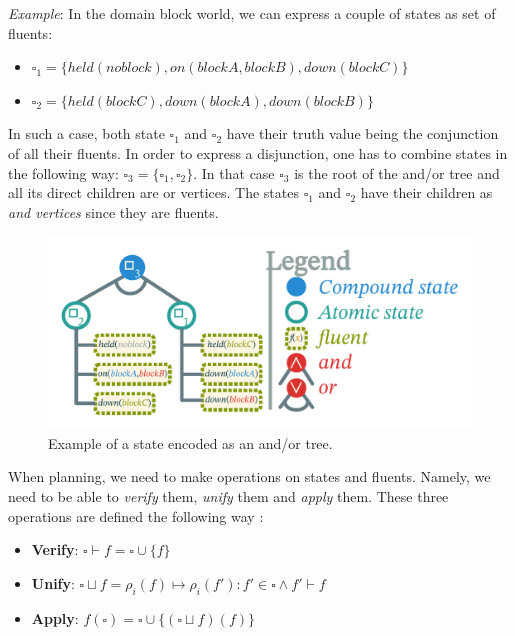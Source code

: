 \documentclass[11pt,a4paper,twoside,openright,titlepage,numbers=noenddot,headinclude,cleardoublepage=empty,openany]{scrreprt}
\theoremstyle{plain}
\theoremstyle{definition}
\theoremstyle{remark}
\providecommand{\tightlist}{%
  \setlength{\itemsep}{0pt}\setlength{\parskip}{0pt}}
\begin{document}
\emph{Example}: In the domain block world, we can express a couple of
states as set of fluents:

\begin{itemize}
\tightlist
\item
  \(\smwhtsquare_1 = \{held(noblock), on(blockA, blockB), down(blockC)\}\)
\item
  \(\smwhtsquare_2 = \{held(blockC), down(blockA), down(blockB)\}\)
\end{itemize}

In such a case, both state \(\smwhtsquare_1\) and \(\smwhtsquare_2\)
have their truth value being the conjunction of all their fluents. In
order to express a disjunction, one has to combine states in the
following way: \(\smwhtsquare_3 = \{\smwhtsquare_1, \smwhtsquare_2\}\).
In that case \(\smwhtsquare_3\) is the root of the and/or tree and all
its direct children are or vertices. The states \(\smwhtsquare_1\) and
\(\smwhtsquare_2\) have their children as \emph{and vertices} since they
are fluents.

\begin{figure}
\hypertarget{fig:state_tree}{%
\centering
\includegraphics{./tex2pdf.-0b80fea6fd6da7f9/1829becf32257d5a8e5d0bfba39ebbec1e512b6e.pdf}
\caption{Example of a state encoded as an and/or
tree.}\label{fig:state_tree}
}
\end{figure}

When planning, we need to make operations on states and fluents. Namely,
we need to be able to \emph{verify} them, \emph{unify} them and
\emph{apply} them. These three operations are defined the following way
:

\begin{itemize}
\tightlist
\item
  \textbf{Verify}: \(\smwhtsquare \vdash f = \smwhtsquare \cup \{f\}\)
\item
  \textbf{Unify}:
  \(\smwhtsquare \sqcup f = \rho_i(f) \mapsto \rho_i(f') : f' \in \smwhtsquare \land f' \vdash f\)
\item
  \textbf{Apply}:
  \(f(\smwhtsquare) = \smwhtsquare \cup \{(\smwhtsquare \sqcup f)(f)\}\)
\end{itemize}
\end{document}
